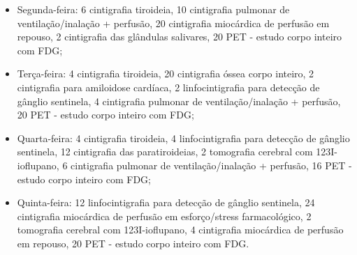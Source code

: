 \begin{itemize}
\item Segunda-feira: 6 cintigrafia tiroideia, 10 cintigrafia pulmonar de ventilação/inalação + perfusão, 20 cintigrafia miocárdica de perfusão em repouso, 2 cintigrafia das glândulas salivares, 20 PET - estudo corpo inteiro com FDG;
\item Terça-feira: 4 cintigrafia tiroideia, 20 cintigrafia óssea corpo inteiro, 2 cintigrafia para amiloidose cardíaca, 2 linfocintigrafia para detecção de gânglio sentinela, 4 cintigrafia pulmonar de ventilação/inalação + perfusão, 20 PET - estudo corpo inteiro com FDG;
\item Quarta-feira: 4 cintigrafia tiroideia, 4 linfocintigrafia para detecção de gânglio sentinela, 12 cintigrafia das paratiroideias, 2 tomografia cerebral com 123I-ioflupano, 6 cintigrafia pulmonar de ventilação/inalação + perfusão, 16 PET - estudo corpo inteiro com FDG;
\item Quinta-feira: 12 linfocintigrafia para detecção de gânglio sentinela, 24 cintigrafia miocárdica de perfusão em esforço/stress farmacológico, 2 tomografia cerebral com 123I-ioflupano, 4 cintigrafia miocárdica de perfusão em repouso, 20 PET - estudo corpo inteiro com FDG.
\end{itemize}

